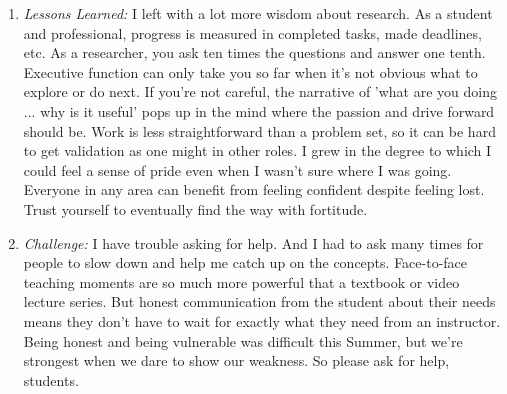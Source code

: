 \documentclass[12pt]{article}
\begin{document}
\begin{enumerate}
\item \textit{Lessons Learned: }I left with a lot more wisdom about research. As a student and professional, progress is measured in completed tasks, made deadlines, etc. As a researcher, you ask ten times the questions and answer one tenth. Executive function can only take you so far when it's not obvious what to explore or do next. If you're not careful, the narrative of 'what are you doing ... why is it useful' pops up in the mind where the passion and drive forward should be. Work is less straightforward than a problem set, so it can be hard to get validation as one might in other roles. I grew in the degree to which I could feel a sense of pride even when I wasn't sure where I was going. Everyone in any area can benefit from feeling confident despite feeling lost. Trust yourself to eventually find the way with fortitude. 
\item \textit{Challenge: }I have trouble asking for help. And I had to ask many times for people to slow down and help me catch up on the concepts. Face-to-face teaching moments are so much more powerful that a textbook or video lecture series. But honest communication from the student about their needs means they don't have to wait for exactly what they need from an instructor. Being honest and being vulnerable was difficult this Summer, but we're strongest when we dare to show our weakness. So please ask for help, students.
\end{enumerate}
 
 
\end{document}
